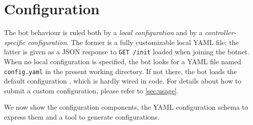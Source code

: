 \section{Configuration}
\label{sec:configuration}

The bot behaviour is ruled both by a \textit{local configuration} and by a \textit{controller-specific configuration}. The former is a fully customizable local YAML file; the latter is given as a JSON response to \texttt{GET /init} loaded when joining the botnet.
When no local configuration is specified, the bot looks for a YAML file named \texttt{config.yaml} in the present working directory. If not there, the bot loads the default configuration , which is hardly wired in code. For details about how to submit a custom configuration, please refer to \ref{sec:usage}.

We now show the configuration components, the YAML configuration schema to express them and a tool to generate configurations.

